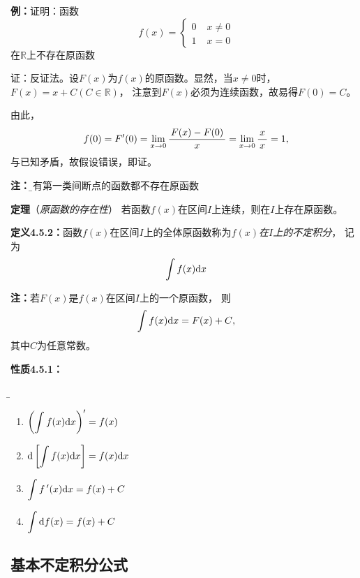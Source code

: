 {\bf 例：}证明：函数$$f(x)=\left\{\begin{array}{ll}
0\;& x\ne 0\\1\;& x=0\end{array}\right.$$在$\mathbb{R}$上不存在原函数

证：反证法。设$F(x)$为$f(x)$的原函数。显然，当$x\ne0$时，$F(x)=x+C(C\in\mathbb{R})$，
注意到$F(x)$必须为连续函数，故易得$F(0)=C$。

由此，
$$f(0)=F'(0)=\lim\limits_{x\to{0}}\displaystyle\frac{\,{F(x)-F(0)}\,}{\,{x}\,}=\lim\limits_{x\to{0}}\displaystyle\frac{\,{x}\,}{\,{x}\,}=1,$$
与已知矛盾，故假设错误，即证。

{\bf 注：}{\b 具有第一类间断点的函数都不存在原函数}

{\bf 定理}（{\it 原函数的存在性}）
若函数$f(x)$在区间$I$上连续，则在$I$上存在原函数。

{\bf 定义4.5.2：}函数$f(x)$在区间$I$上的全体原函数称为{\it $f(x)$在$I$上的不定积分}，
记为
$$\int f(x)\mathrm{d} x$$

{\bf 注：}若$F(x)$是$f(x)$在区间$I$上的一个原函数， 则
$${\int f(x)\mathrm{d} x=F(x)+C},$$
其中$C$为任意常数。

{\bf 性质4.5.1：}{\b
\begin{enumerate}[(1)]
  \setlength{\itemindent}{1cm}
  \item $\left(\displaystyle\int f(x)\mathrm{d} x\right)'=f(x)$ 
  \item $\mathrm{d}\left[\displaystyle\int f(x)\mathrm{d} x\right]=f(x)\mathrm{d} x$ 
  \item $\displaystyle\int f\,'(x)\mathrm{d} x =f(x)+C$
  \item $\displaystyle\int \mathrm{d} f(x)=f(x)+C$
\end{enumerate}}

\subsection{基本不定积分公式}

